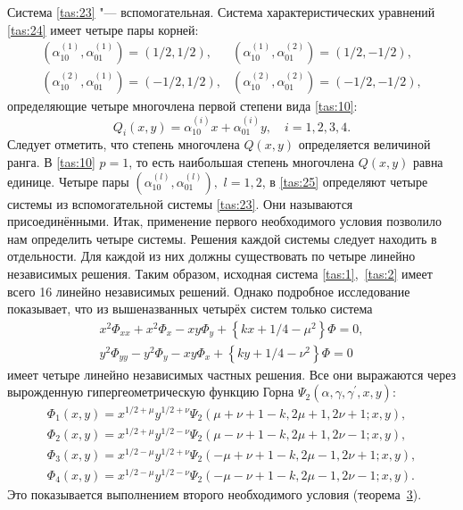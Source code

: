 Система \eqref{tas:23} "--- вспомогательная. Система
характеристических уравнений \eqref{tas:24} имеет четыре пары корней:
\begin{equation}
\begin{array}{ll}
(\alpha_{10}^{(1)},\alpha_{01}^{(1)})=({1}/{2},  {1}/{2}), &
(\alpha_{10}^{(1)},\alpha_{01}^{(2)})=({1}/{2}, -{1}/{2}),\\[2mm]
(\alpha_{10}^{(2)},\alpha_{01}^{(1)})=(-{1}/{2}, {1}/{2}), &
(\alpha_{10}^{(2)},\alpha_{01}^{(2)})=(-{1}/{2},-{1}/{2}),
\end{array}
\label{tas:25}
\end{equation}
определяющие четыре многочлена первой степени вида \eqref{tas:10}:
$$
Q_{i}(x,y)=\alpha_{10}^{(i)}   x+\alpha_{01}^{(i)}   y, \quad i=1, 2, 3, 4.
$$ 
Следует отметить, что степень многочлена $Q(x,y)$ определяется величиной ранга. 
В \eqref{tas:10} $p=1$, то есть наибольшая степень многочлена $Q(x,y)$ равна единице. 
Четыре пары $(\alpha_{10}^{(l)}, \alpha_{01}^{(l)}),$ $l=1, 2$, в
\eqref{tas:25} определяют четыре системы из вспомогательной системы \eqref{tas:23}.
Они называются присоединёнными. Итак, применение первого
необходимого условия позволило нам определить четыре системы.
Решения каждой системы следует находить в отдельности. Для каждой
из них должны существовать по четыре линейно независимых решения.
Таким образом, исходная система \eqref{tas:1},~\eqref{tas:2} имеет всего 16
линейно независимых решений. Однако подробное исследование
показывает, что из вышеназванных четырёх систем только система
\begin{equation}
\begin{array}{l}
x^{2}   \Phi_{xx}+x^{2}   \Phi_{x}-xy  
\Phi_{y}+\left\{k   x+{1}/{4}-\mu^{2}
\right\}   \Phi=0, \\[0.2cm]
y^{2}   \Phi_{yy}-y^{2}    \Phi_{y}-xy   \Phi_{x}
+\left\{k   y+{1}/{4}-\nu^{2} \right\}  
\Phi=0
\end{array}
\label{tas:26}
\end{equation}
имеет четыре линейно независимых частных решения. Все они
выражаются через вырожденную гипергеометрическую функцию Горна
$\Psi_{2}(\alpha, \gamma, \gamma^{\prime}, x, y)$:
$$
\begin{array}{l}
\Phi_{1}(x,y)=x^{{1}/{2}+\mu}   y^{{1}/{2}+\nu}  
\Psi_{2}(\mu+\nu+1-k, 2\mu+1, 2\nu+1; x,y), 
\\
\Phi_{2}(x,y)=x^{{1}/{2}+\mu}   y^{{1}/{2}-\nu}  
\Psi_{2}(\mu-\nu+1-k, 2\mu+1, 2\nu-1; x,y),
\\
\Phi_{3}(x,y)=x^{{1}/{2}-\mu}   y^{{1}/{2}+\nu}  
\Psi_{2}(-\mu+\nu+1-k, 2\mu-1, 2\nu+1; x,y),
\\
\Phi_{4}(x,y)=x^{{1}/{2}-\mu}   y^{{1}/{2}-\nu}  
\Psi_{2}(-\mu-\nu+1-k, 2\mu-1, 2\nu-1; x,y).
\end{array}
$$
Это показывается выполнением второго необходимого условия (теорема~\hyperlink{tasm:3}{3}). 

